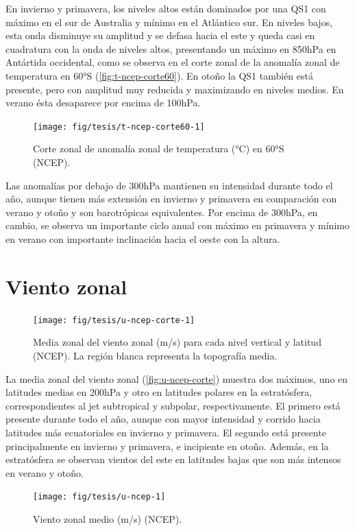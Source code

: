 \documentclass[spanish,a4paper,12pt,oneside]{book}
\begin{document}
En invierno y primavera, los niveles altos están dominados por una QS1
con máximo en el sur de Australia y mínimo en el Atlántico sur. En
niveles bajos, esta onda disminuye su amplitud y se defasa hacia el este
y queda casi en cuadratura con la onda de niveles altos, presentando un
máximo en 850hPa en Antártida occidental, como se observa en el corte
zonal de la anomalía zonal de temperatura en 60°S
(\autoref{fig:t-ncep-corte60}). En otoño la QS1 también está presente,
pero con amplitud muy reducida y maximizando en niveles medios. En
verano ésta desaparece por encima de 100hPa.

\begin{figure}
\texttt{[image: fig/tesis/t-ncep-corte60-1]} \caption{Corte zonal de anomalía zonal de temperatura (°C) en 60°S (NCEP).}\label{fig:t-ncep-corte60}
\end{figure}

Las anomalías por debajo de 300hPa mantienen su intensidad durante todo
el año, aunque tienen más extensión en invierno y primavera en
comparación con verano y otoño y son barotrópicas equivalentes. Por
encima de 300hPa, en cambio, se observa un importante ciclo anual con
máximo en primavera y mínimo en verano con importante inclinación hacia
el oeste con la altura.

\hypertarget{viento-zonal}{%
\section{Viento zonal}\label{viento-zonal}}

\begin{figure}
\texttt{[image: fig/tesis/u-ncep-corte-1]} \caption{Media zonal del viento zonal (m/s) para cada nivel vertical y latitud (NCEP). La región blanca representa la topografía media.}\label{fig:u-ncep-corte}
\end{figure}

La media zonal del viento zonal (\autoref{fig:u-ncep-corte}) muestra dos
máximos, uno en latitudes medias en 200hPa y otro en latitudes polares
en la estratósfera, correspondientes al jet subtropical y subpolar,
respectivamente. El primero está presente durante todo el año, aunque
con mayor intensidad y corrido hacia latitudes más ecuatoriales en
invierno y primavera. El segundo está presente principalmente en
invierno y primavera, e incipiente en otoño. Además, en la estratósfera
se observan vientos del este en latitudes bajas que son más intensos en
verano y otoño.

\begin{landscape}\begin{figure}

{\centering \texttt{[image: fig/tesis/u-ncep-1]} 

}

\caption{Viento zonal medio (m/s) (NCEP).}\label{fig:u-ncep}
\end{figure}
\end{landscape}
\end{document}
